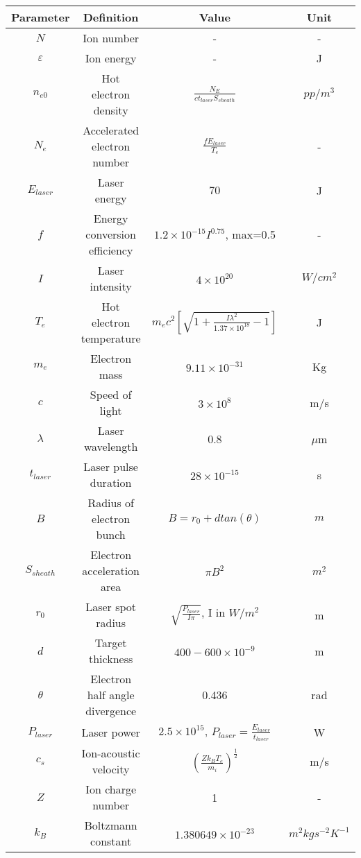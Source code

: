 \begin{itemize}
    \begin{longtable}{c c c c} 
      \hline
      \textbf{Parameter} & \textbf{Definition} & \textbf{Value} & \textbf{Unit} \\ [1ex] 
      \hline \hline
      \endfirsthead 
       $N$ & Ion number & - & - \\ 
       $\varepsilon$ & Ion energy & - & J \\  
       $n_{e0}$ & Hot electron density & $\frac{N_{E}}{c t_{laser} S_{sheath}}$ & $pp/m^3$ \\ 
       $N_{e}$ & Accelerated electron number & $\frac{f E_{laser}}{T_e}$ & - \\ 
       $E_{laser}$ & Laser energy & $70$ & J \\  
       $f$ & Energy conversion efficiency & $1.2 \times 10^{-15} I^{0.75}$, max=0.5  & - \\   %
       $I$ & Laser intensity & $4 \times 10^{20}$ & $W/cm^{2}$ \\ 
       $T_{e}$ & Hot electron temperature & $m_{e} c^{2} [\sqrt{1 + \frac{I \lambda^{2}}{1.37 \times 10^{18}} -1} ]$ & J \\ 
       $m_{e}$ & Electron mass & $9.11 \times 10^{-31}$ & Kg \\ 
       $c$ & Speed of light & $3 \times 10^{8}$ & m/s \\ 
       $\lambda$ & Laser wavelength & 0.8 & $\mu$m \\  
       $t_{laser}$ & Laser pulse duration & $28 \times 10^{-15}$  & s \\  
       $B$ & Radius of electron bunch & $B=r_{0} + d tan(\theta)$ & $m$ \\ 
       $S_{sheath}$ & Electron acceleration area & $\pi B^{2}$ & $m^{2}$ \\ 
       $r_{0}$ & Laser spot radius & $\sqrt{\frac{P_{laser}}{I \pi}}$, I in $W/m^{2}$ & m \\  
       $d$ & Target thickness & $400-600 \times 10^{-9}$ & m \\  
       $\theta$ & Electron half angle divergence & 0.436 & rad \\  
       $P_{laser}$ & Laser power & $2.5 \times 10^{15}$, $P_{laser}=\frac{E_{laser}}{t_{laser}}$ & W \\  
       $c_{s}$ & Ion-acoustic velocity & $(\frac{Z k_{B} T_{e}}{m_{i}})^{\frac{1}{2}}$ & m/s \\  
       $Z$ & Ion charge number & 1 & - \\  
       $k_{B}$ & Boltzmann constant & $1.380649 \times 10^{-23}$ & $m^{2} kg s^{-2} K^{-1}$ \\  

\end{longtable}
\end{itemize}
